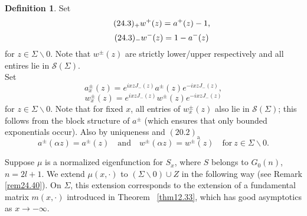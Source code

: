\documentclass{surv-l}
\theoremstyle{plain}
\theoremstyle{definition}
\newtheorem{definition}[theorem]{Definition}
\numberwithin{equation}{chapter}
\begin{document}
\begin{definition}
Set
\begin{equation*}
\tag*{$(24.3)_{+}$}  w^{+}(z)=a^{+}(z)-1,
\end{equation*}
\begin{equation*}
\tag*{$(24.3)_{-}$}  w^{-}(z)=1-a^{-}(z)
\end{equation*}
for $z\in\Sigma\backslash0$. Note that $w^{\pm}(z)$ are strictly lower/upper respectively and all entires lie in $\mathscr{S}(\Sigma)$.\\
Set
\renewcommand{\theequation}{\thesection.\arabic{equation}}
\setcounter{equation}{3}
\begin{equation}\label{eq24.4}
a_{x}^{\pm}(z) = e^{ixzJ_{-}(z)}a^{\pm}(z)e^{-ixzJ_{-}(z)},
\end{equation}
\begin{equation}\label{eq24.5}
w_{x}^{\pm}(z) = e^{ixzJ_{-}(z)}w^{\pm}(z)e^{-ixzJ_{-}(z)}
\end{equation}
for $z\in\Sigma\backslash 0$. Note that for fixed $x$, all entries of $w_{x}^{\pm}(z)$ also lie in $\mathscr{S}(\Sigma)$; this follows from the block structure of $a^{\pm}$ (which ensures that only bounded exponentials occur). Also by uniqueness and $(20.2)_{\mathrm{a}}$
\begin{equation}\label{eq24.6}
a^{\pm}(\alpha z)=a^{\pm}(z)\quad \mathrm{and}\quad w^{\pm}(\alpha z)=w^{\pm}(z)\quad \mathrm{for}\ z\in\Sigma\backslash 0.
\end{equation}

Suppose $\mu$ is a normalized eigenfunction for $S_{x}$, where $S$ belongs to $G_{0}(n)$, $n=2l+1$. We extend $\mu(x, \cdot)$ to $(\Sigma\backslash 0)\cup Z$ in the following way (see Remark \ref{rem24.40}). On $\Sigma$, this extension corresponds to the extension of a fundamental matrix $m(x, \cdot)$ introduced in Theorem ~\ref{thm12.33}, which has good asymptotics as $ x\rightarrow-\infty$.
\end{definition}



\setcounter{theorem}{6}
\end{document}
